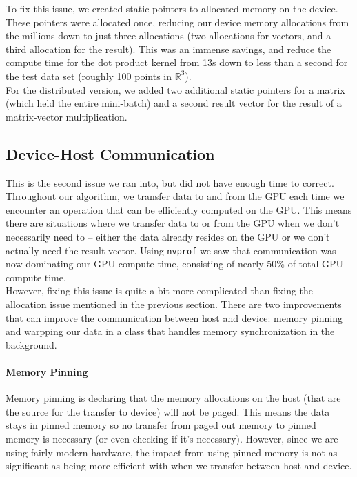 \documentclass{article}
\def \R {\mathbb{R}}
\def \R {\mathbb{R}}
\begin{document}
To fix this issue, we created static
pointers to allocated memory on the device. These pointers were allocated once,
reducing our device memory allocations from the millions down to just three
allocations (two allocations for vectors, and a third allocation for the
result). This was an immense savings, and reduce the compute time for the dot
product kernel from 13s down to less than a second for the test data set
(roughly 100 points in $\R^3$).\\

For the distributed version, we added two additional static pointers for a
matrix (which held the entire mini-batch) and a second result vector for the
result of a matrix-vector multiplication. 

\subsection{Device-Host Communication}
This is the second issue we ran into, but did not have enough time to correct.
Throughout our algorithm, we transfer data to and from the GPU each time we
encounter an operation that can be efficiently computed on the GPU. This means
there are situations where we transfer data to or from the GPU when we don't
necessarily need to -- either the data already resides on the GPU or we don't
actually need the result vector. Using \texttt{nvprof} we saw that
communication was now dominating our GPU compute time, consisting of nearly
50\% of total GPU compute time.\\

However, fixing this issue is quite a bit more complicated than fixing the
allocation issue mentioned in the previous section. There are two improvements
that can improve the communication between host and device: memory pinning and
warpping our data in a class that handles memory synchronization in the
background.

\paragraph{Memory Pinning} Memory pinning is declaring that the memory
allocations on the host (that are the source for the transfer to device) will
not be paged. This means the data stays in pinned memory so no transfer from
paged out memory to pinned memory is necessary (or even checking if it's
necessary). However, since we are using fairly modern hardware, the impact from
using pinned memory is not as significant as being more efficient with when we
transfer between host and device.
\end{document}
